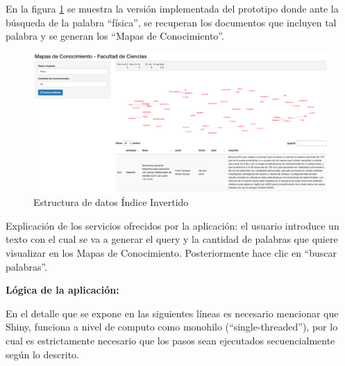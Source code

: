 \documentclass[
  12pt,
  openany]{book}
\begin{document}
En la figura \ref{fig:prototipoapp} se muestra la versión implementada del prototipo donde ante la búsqueda de la palabra ``física'', se recuperan los documentos que incluyen tal palabra y se generan los ``Mapas de Conocimiento''.

\begin{figure}

{\centering \includegraphics[width=0.8\linewidth]{images/05-desarrollo/2_ciclo/UI/prototipo_app} 

}

\caption{Estructura de datos Índice Invertido}\label{fig:prototipoapp}
\end{figure}

Explicación de los servicios ofrecidos por la aplicación: el usuario introduce un texto con el cual se va a generar el query y la cantidad de palabras que quiere visualizar en los Mapas de Conocimiento. Posteriormente hace clic en ``buscar palabras''.

\textbf{Lógica de la aplicación:}

En el detalle que se expone en las siguientes líneas es necesario mencionar que Shiny, funciona a nivel de computo como monohilo (``single-threaded''), por lo cual es estrictamente necesario que los pasos sean ejecutados secuencialmente según lo descrito.
\end{document}
